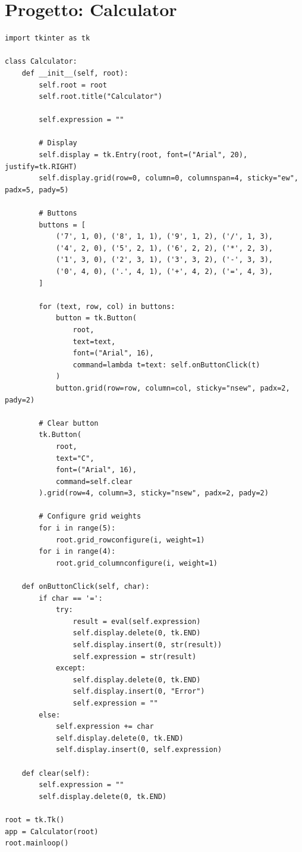 \section{Progetto: Calculator}

\begin{lstlisting}
import tkinter as tk

class Calculator:
    def __init__(self, root):
        self.root = root
        self.root.title("Calculator")

        self.expression = ""

        # Display
        self.display = tk.Entry(root, font=("Arial", 20), justify=tk.RIGHT)
        self.display.grid(row=0, column=0, columnspan=4, sticky="ew", padx=5, pady=5)

        # Buttons
        buttons = [
            ('7', 1, 0), ('8', 1, 1), ('9', 1, 2), ('/', 1, 3),
            ('4', 2, 0), ('5', 2, 1), ('6', 2, 2), ('*', 2, 3),
            ('1', 3, 0), ('2', 3, 1), ('3', 3, 2), ('-', 3, 3),
            ('0', 4, 0), ('.', 4, 1), ('+', 4, 2), ('=', 4, 3),
        ]

        for (text, row, col) in buttons:
            button = tk.Button(
                root,
                text=text,
                font=("Arial", 16),
                command=lambda t=text: self.onButtonClick(t)
            )
            button.grid(row=row, column=col, sticky="nsew", padx=2, pady=2)

        # Clear button
        tk.Button(
            root,
            text="C",
            font=("Arial", 16),
            command=self.clear
        ).grid(row=4, column=3, sticky="nsew", padx=2, pady=2)

        # Configure grid weights
        for i in range(5):
            root.grid_rowconfigure(i, weight=1)
        for i in range(4):
            root.grid_columnconfigure(i, weight=1)

    def onButtonClick(self, char):
        if char == '=':
            try:
                result = eval(self.expression)
                self.display.delete(0, tk.END)
                self.display.insert(0, str(result))
                self.expression = str(result)
            except:
                self.display.delete(0, tk.END)
                self.display.insert(0, "Error")
                self.expression = ""
        else:
            self.expression += char
            self.display.delete(0, tk.END)
            self.display.insert(0, self.expression)

    def clear(self):
        self.expression = ""
        self.display.delete(0, tk.END)

root = tk.Tk()
app = Calculator(root)
root.mainloop()
\end{lstlisting}

